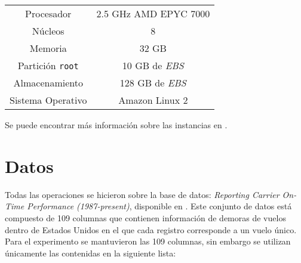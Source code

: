 \begin{center}
\begin{tabular}{|c|c|}
 \hline
  Procesador & 2.5 GHz AMD EPYC 7000 \\ 
  Núcleos & 8 \\
  Memoria & 32 GB \\ 
  Partición \texttt{root} & 10 GB de \textit{EBS}  \\
  Almacenamiento & 128 GB de \textit{EBS}  \\ 
  Sistema Operativo & Amazon Linux 2 \\
  \hline
\end{tabular}
\end{center}

Se puede encontrar más información sobre las instancias en \cite{ec2-instances}.

\section{Datos}

Todas las operaciones se hicieron sobre la base de datos: 
\textit{Reporting Carrier On-Time Performance (1987-present)}, disponible en \cite{linktranstat}. Este conjunto de datos está compuesto de 109 columnas que contienen información de demoras de vuelos dentro de Estados Unidos en el que cada registro corresponde a un vuelo único. Para el experimento se mantuvieron las 109 columnas, sin embargo se utilizan únicamente las contenidas en la siguiente lista:

